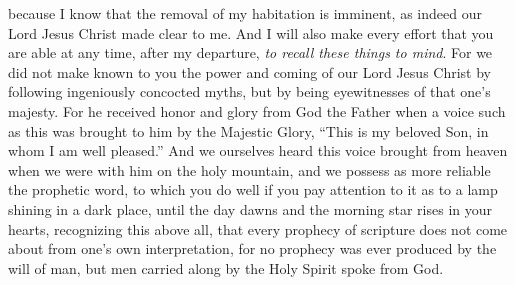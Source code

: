 \begin{biblechapter}
\verse because I know that the removal of my habitation is imminent, as indeed our Lord Jesus Christ made clear to me.
\verse And I will also make every effort that you are able at any time, after my departure, \textit{to recall these things to mind}.
 For we did not make known to you the power and coming of our Lord Jesus Christ by following ingeniously concocted myths, but by being eyewitnesses of that one’s majesty.
\verse For he received honor and glory from God the Father when a voice such as this was brought to him by the Majestic Glory, “This is my beloved Son, in whom I am well pleased.”
\verse And we ourselves heard this voice brought from heaven when we were with him on the holy mountain,
\verse and we possess as more reliable the prophetic word, to which you do well if you pay attention to it as to a lamp shining in a dark place, until the day dawns and the morning star rises in your hearts,
\verse recognizing this above all, that every prophecy of scripture does not come about from one’s own interpretation,
\verse for no prophecy was ever produced by the will of man, but men carried along by the Holy Spirit spoke from God.
\end{biblechapter}


